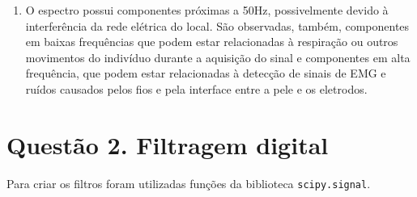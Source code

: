 \documentclass[12pt,letterpaper]{article}
\begin{document}
\begin{enumerate}[label=(\alph*)]
    \item
    O espectro possui componentes próximas a 50Hz, possivelmente devido à interferência da rede elétrica do local. São observadas, também, componentes em baixas frequências que podem estar relacionadas à respiração ou outros movimentos do indivíduo durante a aquisição do sinal e componentes em alta frequência, que podem estar relacionadas à detecção de sinais de EMG e ruídos causados pelos fios e pela interface entre a pele e os eletrodos.
    
\end{enumerate}

\section*{Questão 2. Filtragem digital}
Para criar os filtros foram utilizadas funções da biblioteca \lstinline{scipy.signal}.
\end{document}
